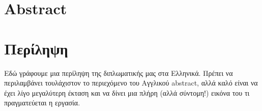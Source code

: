 %


\chapter*{Abstract}
\label{sec:abstract}

\Blindtext[6][1]


\chapter*{Περίληψη}
\label{sec:abstract_greek}

Εδώ γράφουμε μια περίληψη της διπλωματικής μας στα Ελληνικά. Πρέπει να περιλαμβάνει τουλάχιστον το περιεχόμενο του Αγγλικού abstract, αλλά καλό είναι να έχει λίγο μεγαλύτερη έκταση και να δίνει μια πλήρη (αλλά σύντομη!) εικόνα του τι πραγματεύεται η εργασία.
